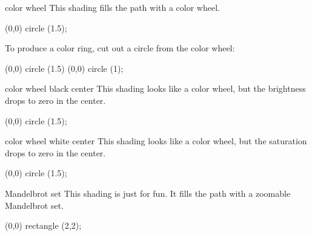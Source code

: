\begin{shading}{color wheel}
  This shading fills the path with a color wheel.
\begin{codeexample}[]
\tikz \shade[shading=color wheel] (0,0) circle (1.5);
\end{codeexample}
  To produce a color ring, cut out a circle from the color wheel:
\begin{codeexample}[]
\tikz {}
  (0,0) circle (1.5)
  (0,0) circle (1);
\end{codeexample}
\end{shading}


\begin{shading}{color wheel black center}
  This shading looks like a color wheel, but the brightness drops to
  zero in the center.
\begin{codeexample}[]
\tikz \shade[shading=color wheel black center] (0,0) circle (1.5);
\end{codeexample}
\end{shading}


\begin{shading}{color wheel white center}
  This shading looks like a color wheel, but the saturation drops to
  zero in the center.
\begin{codeexample}[]
\tikz \shade[shading=color wheel white center] (0,0) circle (1.5);
\end{codeexample}
\end{shading}



\begin{shading}{Mandelbrot set}
  This shading is just for fun. It fills the path with a zoomable
  Mandelbrot set.

\begin{codeexample}[]
\tikz \shade[shading=Mandelbrot set] (0,0) rectangle (2,2);
\end{codeexample}
\end{shading}



